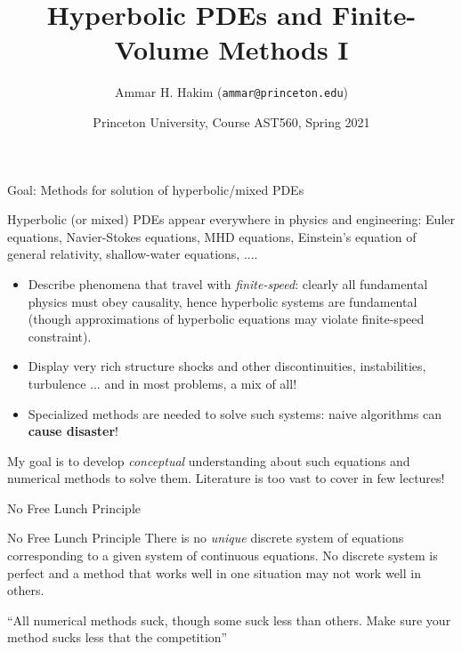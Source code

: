 \documentclass[aspectratio=169]{beamer}
\title[{\tt }]{Hyperbolic PDEs and Finite-Volume Methods I}%
\author[https://ast560.rtfd.io]%
{Ammar H. Hakim ({\tt ammar@princeton.edu}) \inst{1}}%
\institute[PPPL]
{ \inst{1} Princeton Plasma Physics Laboratory, Princeton, NJ %
}
\date[3/9/2021]{Princeton University, Course AST560, Spring 2021}
\newcommand{\mypause}{}
\begin{document}
\begin{frame}[plain]
  \titlepage
\end{frame}

\begin{frame}{Goal: Methods for solution of hyperbolic/mixed PDEs}

  Hyperbolic (or mixed) PDEs appear everywhere in physics and
  engineering: Euler equations, Navier-Stokes equations, MHD
  equations, Einstein's equation of general relativity, shallow-water
  equations, ....%
  \mypause%
  \begin{itemize}
  \item Describe phenomena that travel with \emph{finite-speed}:
    clearly all fundamental physics must obey causality, hence
    hyperbolic systems are fundamental (though approximations of
    hyperbolic equations may violate finite-speed constraint).
    \mypause%
  \item Display very rich structure shocks and other discontinuities,
    instabilities, turbulence ... and in most problems, a mix of all!
    \mypause%
  \item Specialized methods are needed to solve such systems: naive
    algorithms can {\bf cause disaster}!
  \end{itemize}
  \mypause%
  My goal is to develop \emph{conceptual} understanding about such
  equations and numerical methods to solve them. Literature is too
  vast to cover in few lectures!

\end{frame}


\begin{frame}{No Free Lunch Principle}

  \begin{block}{No Free Lunch Principle}
    There is no \emph{unique} discrete system of equations
    corresponding to a given system of continuous equations. No
    discrete system is perfect and a method that works well in one
    situation may not work well in others.
  \end{block}
  \vskip0.1in%
  \mypause%
  ``All numerical methods suck, though some suck less than
  others. Make sure your method sucks less that the competition''
  
\end{frame}

\end{document}
